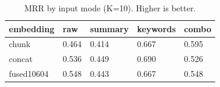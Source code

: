\begin{table}
\caption{MRR by input mode (K=10). Higher is better.}
\label{tab:mrr-by-mode}
\begin{tabular}{lllll}
\toprule
embedding & raw & summary & keywords & combo \\
\midrule
chunk & 0.464 & 0.414 & 0.667 & 0.595 \\
concat & 0.536 & 0.449 & 0.690 & 0.526 \\
fused10604 & 0.548 & 0.443 & 0.667 & 0.548 \\
\bottomrule
\end{tabular}
\end{table}
